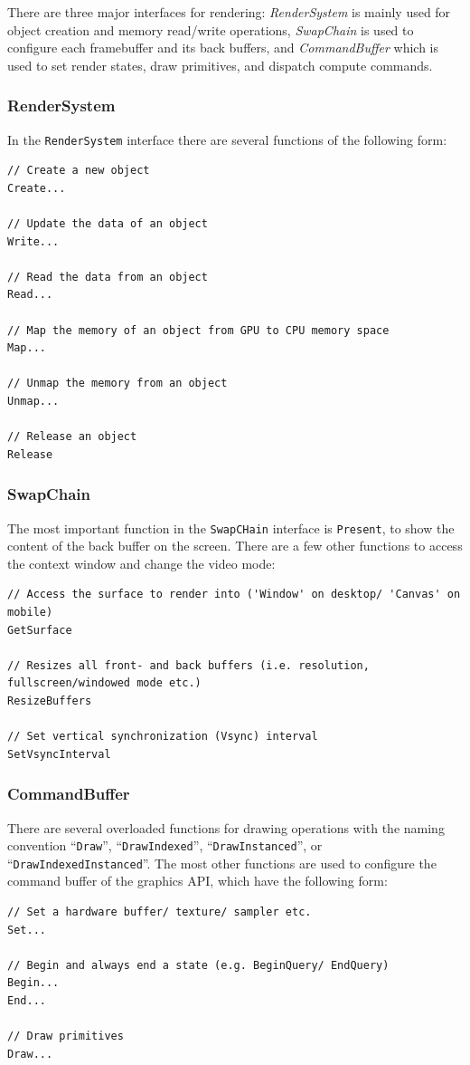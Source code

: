 \documentclass{article}
\begin{document}
There are three major interfaces for rendering:
\emph{RenderSystem} is mainly used for object creation and memory read/write operations,
\emph{SwapChain} is used to configure each framebuffer and its back buffers,
and \emph{CommandBuffer} which is used to set render states, draw primitives, and dispatch compute commands.

\subsubsection{RenderSystem}

In the \texttt{RenderSystem} interface there are several functions of the following form:
\begin{lstlisting}
// Create a new object
Create...

// Update the data of an object
Write...

// Read the data from an object
Read...

// Map the memory of an object from GPU to CPU memory space
Map...

// Unmap the memory from an object
Unmap...

// Release an object
Release
\end{lstlisting}

\subsubsection{SwapChain}

The most important function in the \texttt{SwapCHain} interface is \texttt{Present},
to show the content of the back buffer on the screen.
There are a few other functions to access the context window and change the video mode:
\begin{lstlisting}
// Access the surface to render into ('Window' on desktop/ 'Canvas' on mobile)
GetSurface

// Resizes all front- and back buffers (i.e. resolution, fullscreen/windowed mode etc.)
ResizeBuffers

// Set vertical synchronization (Vsync) interval
SetVsyncInterval
\end{lstlisting}

\subsubsection{CommandBuffer}

There are several overloaded functions for drawing operations with the naming convention
``\texttt{Draw}'', ``\texttt{DrawIndexed}'', ``\texttt{DrawInstanced}'', or ``\texttt{DrawIndexedInstanced}''.
The most other functions are used to configure the command buffer of the graphics API, which have the following form:
\begin{lstlisting}
// Set a hardware buffer/ texture/ sampler etc.
Set...

// Begin and always end a state (e.g. BeginQuery/ EndQuery)
Begin...
End...

// Draw primitives
Draw...
\end{lstlisting}
\end{document}
